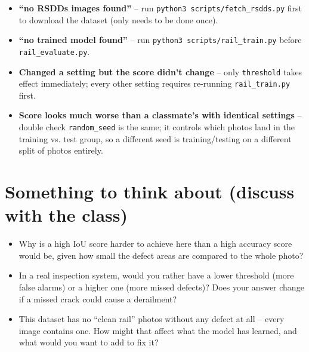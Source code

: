 \documentclass[11pt]{article}
\begin{document}
\begin{warnbox}
\begin{itemize}
  \item \textbf{``no RSDDs images found''} -- run \texttt{python3 scripts/fetch\_rsdds.py} first to download the dataset (only needs to be done once).
  \item \textbf{``no trained model found''} -- run \texttt{python3 scripts/rail\_train.py} before \texttt{rail\_evaluate.py}.
  \item \textbf{Changed a setting but the score didn't change} -- only \texttt{threshold} takes effect immediately; every other setting requires re-running \texttt{rail\_train.py} first.
  \item \textbf{Score looks much worse than a classmate's with identical settings} -- double check \texttt{random\_seed} is the same; it controls which photos land in the training vs. test group, so a different seed is training/testing on a different split of photos entirely.
\end{itemize}
\end{warnbox}

\section*{Something to think about (discuss with the class)}
\begin{itemize}
  \item Why is a high IoU score harder to achieve here than a high accuracy score would be, given how small the defect areas are compared to the whole photo?
  \item In a real inspection system, would you rather have a lower threshold (more false alarms) or a higher one (more missed defects)? Does your answer change if a missed crack could cause a derailment?
  \item This dataset has no ``clean rail'' photos without any defect at all -- every image contains one. How might that affect what the model has learned, and what would you want to add to fix it?
\end{itemize}
\end{document}
